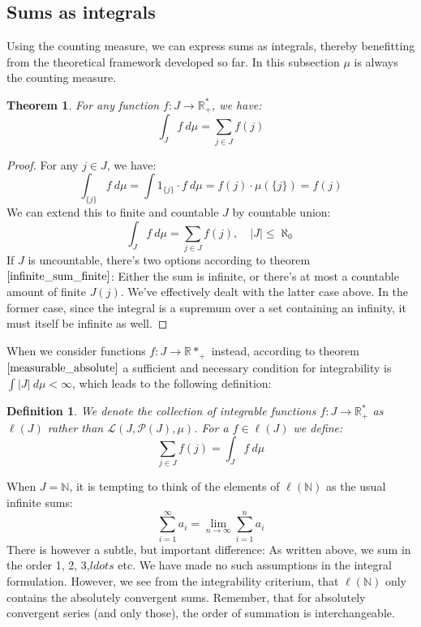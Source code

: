 \documentclass[12pt, a4paper]{article}
\newtheorem{theorem}{Theorem}[section]
\newtheorem{definition}{Definition}[section]
\numberwithin{equation}{section}
\begin{document}
\subsection{Sums as integrals}
Using the counting measure, we can express sums as integrals, thereby benefitting from the theoretical framework developed so far. In this subsection $\mu$ is always the counting measure.

\begin{theorem}
For any function $f: J\rightarrow\mathbb{R}^*_+$, we have:
\begin{equation}
\int_J f\ d\mu=\sum_{j\in J}f(j)
\end{equation}
\end{theorem}
\begin{proof}
For any $j\in J$, we have:
\begin{equation}
\int_{\{j\}}f\ d\mu=\int 1_{\{j\}}\cdot f\ d\mu=f(j)\cdot\mu({\{j\}})=f(j)
\end{equation}
We can extend this to finite and countable $J$ by countable union:
\begin{equation}
\int_J f\ d\mu=\sum_{j\in J}f(j),\quad |J|\le \aleph_0
\end{equation}
If $J$ is uncountable, there's two options according to theorem $\ref{infinite_sum_finite}$: Either the sum is infinite, or there's at most a countable amount of finite $J(j)$. We've effectively dealt with the latter case above. In the former case, since the integral is a supremum over a set containing an infinity, it must itself be infinite as well.
\end{proof}

When we consider functions $ f: J\rightarrow\mathbb{R}*_+$ instead, according to theorem $\ref{measurable_absolute}$ a sufficient and necessary condition for integrability is $\int |J|\ d\mu<\infty$, which leads to the following definition:

\begin{definition}
We denote the collection of integrable functions $ f: J\rightarrow\mathbb{R}^*_+$ as $\ell(J)$ rather than $\mathcal{L}(J,\mathcal{P}(J),\mu)$. For a $f\in\ell(J)$ we define:
\begin{equation}
\sum_{j\in J}f(j)=\int_J f\ d\mu
\end{equation}
\end{definition}

When $J=\mathbb{N}$, it is tempting to think of the elements of $\ell(\mathbb{N})$ as the usual infinite sums:
\begin{equation}
\sum_{i=1}^\infty a_i=\underset{n\rightarrow\infty}{\lim}\sum_{i=1}^n a_i
\end{equation}
There is however a subtle, but important difference: As written above, we sum in the order 1, 2, 3,$ldots$ etc. We have made no such assumptions in the integral formulation. However, we see from the integrability criterium, that $\ell(\mathbb{N})$ only contains the absolutely convergent sums. Remember, that for absolutely convergent series (and only those), the order of summation is interchangeable.
\end{document}
